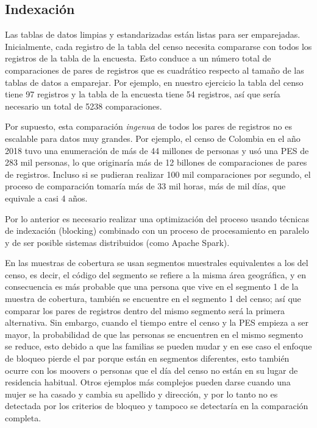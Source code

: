 \documentclass[
  12pt,
]{book}
\begin{document}
\subsection{Indexación}\label{indexaciuxf3n}

Las tablas de datos limpias y estandarizadas están listas para ser emparejadas. Inicialmente, cada registro de la tabla del censo necesita compararse con todos los registros de la tabla de la encuesta. Esto conduce a un número total de comparaciones de pares de registros que es cuadrático respecto al tamaño de las tablas de datos a emparejar. Por ejemplo, en nuestro ejercicio la tabla del censo tiene 97 registros y la tabla de la encuesta tiene 54 registros, así que sería necesario un total de 5238 comparaciones.

Por supuesto, esta comparación \emph{ingenua} de todos los pares de registros no es escalable para datos muy grandes. Por ejemplo, el censo de Colombia en el año 2018 tuvo una enumeración de más de 44 millones de personas y usó una PES de 283 mil personas, lo que originaría más de 12 billones de comparaciones de pares de registros. Incluso si se pudieran realizar 100 mil comparaciones por segundo, el proceso de comparación tomaría más de 33 mil horas, más de mil días, que equivale a casi 4 años.

Por lo anterior es necesario realizar una optimización del proceso usando técnicas de indexación (blocking) combinado con un proceso de procesamiento en paralelo y de ser posible sistemas distribuidos (como Apache Spark).

En las muestras de cobertura se usan segmentos muestrales equivalentes a los del censo, es decir, el código del segmento se refiere a la misma área geográfica, y en consecuencia es más probable que una persona que vive en el segmento 1 de la muestra de cobertura, también se encuentre en el segmento 1 del censo; así que comparar los pares de registros dentro del mismo segmento será la primera alternativa. Sin embargo, cuando el tiempo entre el censo y la PES empieza a ser mayor, la probabilidad de que las personas se encuentren en el mismo segmento se reduce, esto debido a que las familias se pueden mudar y en ese caso el enfoque de bloqueo pierde el par porque están en segmentos diferentes, esto también ocurre con los moovers o personas que el día del censo no están en su lugar de residencia habitual. Otros ejemplos más complejos pueden darse cuando una mujer se ha casado y cambia su apellido y dirección, y por lo tanto no es detectada por los criterios de bloqueo y tampoco se detectaría en la comparación completa.
\end{document}
